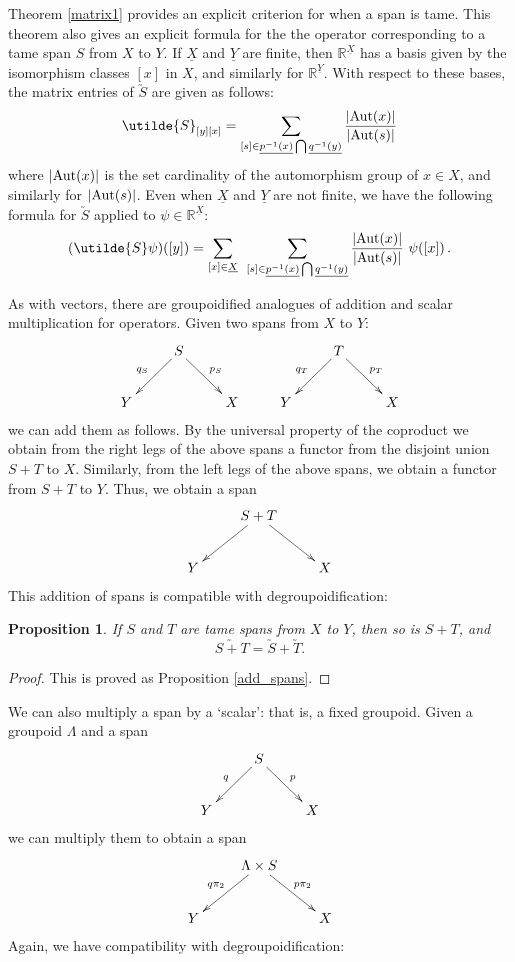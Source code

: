 \documentclass{article}
\newcommand{\R}{{\mathbb R}}
\newcommand{\Aut}{{\rm Aut}}
\renewcommand{\u}[1]{\underline{#1}}
\newtheorem*{proposition*}{Proposition}
\begin{document}
Theorem \ref{matrix1} provides an explicit criterion for when a span
is tame.  This theorem also gives an explicit formula for the the
operator corresponding to a tame span $S$ from $X$ to $Y$.  If
$\u{X}$ and $\u{Y}$ are finite, then
$\R^{\u{X}}$ has a basis given by the isomorphism classes
$[x]$ in $X$, and similarly for $\R^{\u{Y}}$.  With respect to
these bases, the matrix entries of $\utilde{S}$ are given as follows:
\begin{equation}
\label{matrix_entry}
\utilde{S}_{[y][x]} = 
\sum_{[s]\in\u{p^{-1}(x)}\bigcap \u{q^{-1}(y)} }\frac{|\Aut(x)|}{|\Aut(s)|}
\end{equation}
where $|\Aut(x)|$ is the set cardinality of the automorphism group of
$x \in X$, and similarly for $|\Aut(s)|$.  Even when $\u{X}$
and $\u{Y}$ are not finite, we have the following formula for
$\utilde S$ applied to $\psi \in \R^{\u X}$:
\begin{equation}
\label{operator_formula}
(\utilde{S} \psi)([y]) = 
\sum_{[x] \in \u{X}} \;\,
\sum_{[s]\in\u{p^{-1}(x)}\bigcap \u{q^{-1}(y)}}
\frac{|\Aut(x)|}{|\Aut(s)|} \,\, \psi([x]) \, .
\end{equation}

As with vectors, there are groupoidified analogues of addition and scalar
multiplication for operators.  Given two spans from $X$ to $Y$:
\[
\xymatrix{
& S\ar[dl]_{q_S} \ar[dr]^{p_S} & & & T\ar[dl]_{q_T} \ar[dr]^{p_T} & \\
Y & & X & Y & & X
}
\]
we can add them as follows.  By the universal property of the
coproduct we obtain from the right legs of the above spans a functor
from the disjoint union $S + T$ to $X$.  Similarly, from the left legs
of the above spans, we obtain a functor from $S + T$ to $Y$.  Thus, we
obtain a span
\[
\xymatrix{
& S + T\ar[dl] \ar[dr] & \\
Y & & X
}
\]
This addition of spans is compatible with degroupoidification:
\begin{proposition*}
If $S$ and $T$ are tame spans from $X$ to $Y$, then so is $S + T$, and
\[    \utilde{S+T} = \utilde{S} + \utilde{T} .\]
\end{proposition*}
\begin{proof} This is proved as Proposition \ref{add_spans}.
\end{proof}

We can also multiply a span by a `scalar': that is, a fixed groupoid.
Given a groupoid $\Lambda$ and a span
\[
\xymatrix{
& S\ar[dl]_q \ar[dr]^p & \\
Y & & X
}
\]
we can multiply them to obtain a span
\[
\xymatrix{
& \Lambda \times S \ar[dl]_{q\pi_2} \ar[dr]^{p\pi_2} & \\
Y & & X
}
\]
Again, we have compatibility with degroupoidification:
\end{document}
